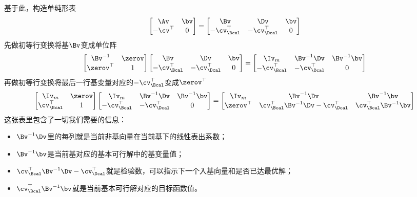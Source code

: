 \documentclass{ctexart}
\begin{document}
基于此，构造单纯形表
\begin{align*}
    \begin{bmatrix}
        \Av & \bv \\ -\cv^\top & 0
    \end{bmatrix} =
    \begin{bmatrix}
        \Bv & \Dv & \bv \\ -\cv_\Bcal^\top & -\cv_\Dcal^\top & 0
    \end{bmatrix}
\end{align*}
先做初等行变换将基$\Bv$变成单位阵
\begin{align*}
    \begin{bmatrix}
        \Bv^{-1} & \zerov \\ \zerov^\top & 1
    \end{bmatrix}
    \begin{bmatrix}
        \Bv & \Dv & \bv \\ -\cv_\Bcal^\top & -\cv_\Dcal^\top & 0
    \end{bmatrix} =
    \begin{bmatrix}
        \Iv_m & \Bv^{-1} \Dv & \Bv^{-1} \bv \\ -\cv_\Bcal^\top & -\cv_\Dcal^\top & 0
    \end{bmatrix}
\end{align*}
再做初等行变换将最后一行基变量对应的$-\cv_\Bcal^\top$变成$\zerov^\top$
\begin{align*}
    \begin{bmatrix}
        \Iv_m & \zerov \\ \cv_\Bcal^\top & 1
    \end{bmatrix}
    \begin{bmatrix}
        \Iv_m & \Bv^{-1} \Dv & \Bv^{-1} \bv \\ -\cv_\Bcal^\top & -\cv_\Dcal^\top & 0
    \end{bmatrix} =
    \begin{bmatrix}
        \Iv_m & \Bv^{-1} \Dv & \Bv^{-1} \bv \\ \zerov^\top & \cv_\Bcal^\top \Bv^{-1} \Dv - \cv_\Dcal^\top & \cv_\Bcal^\top \Bv^{-1} \bv
    \end{bmatrix}
\end{align*}
这张表里包含了一切我们需要的信息：
\begin{itemize}
    \item $\Bv^{-1} \Dv$里的每列就是当前非基向量在当前基下的线性表出系数；
    \item $\Bv^{-1} \bv$是当前基对应的基本可行解中的基变量值；
    \item $\cv_\Bcal^\top \Bv^{-1} \Dv - \cv_\Dcal^\top$就是检验数，可以指示下一个入基向量和是否已达最优解；
    \item $\cv_\Bcal^\top \Bv^{-1} \bv$就是当前基本可行解对应的目标函数值。
\end{itemize}
\end{document}
